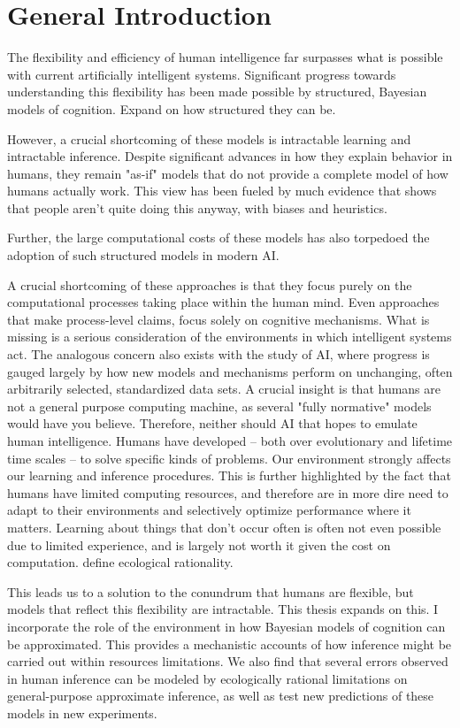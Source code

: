 \chapter{General Introduction}
\label{chap:intro}

The flexibility and efficiency of human intelligence far surpasses what is possible with current artificially intelligent systems. Significant progress towards understanding this flexibility has been made possible by structured, Bayesian models of cognition. Expand on how structured they can be.

However, a crucial shortcoming of these models is intractable learning and intractable inference. Despite significant advances in how they explain behavior in humans, they remain "as-if" models that do not provide a complete model of how humans actually work. This view has been fueled by much evidence that shows that people aren't quite doing this anyway, with biases and heuristics. 

Further, the large computational costs of these models has also torpedoed the adoption of such structured models in modern AI.

A crucial shortcoming of these approaches is that they focus purely on the computational processes taking place within the human mind. Even approaches that make process-level claims, focus solely on cognitive mechanisms. What is missing is a serious consideration of the environments in which intelligent systems act. The analogous concern also exists with the study of AI, where progress is gauged largely by how new models and mechanisms perform on unchanging, often arbitrarily selected, standardized data sets. A crucial insight is that humans are not a general purpose computing machine, as several "fully normative" models would have you believe. Therefore, neither should AI that hopes to emulate human intelligence. Humans have developed -- both over evolutionary and lifetime time scales -- to solve specific kinds of problems. Our environment strongly affects our learning and inference procedures. This is further highlighted by the fact that humans have limited computing resources, and therefore are in more dire need to adapt to their environments and selectively optimize performance where it matters. Learning about things that don't occur often is often not even possible due to limited experience, and is largely not worth it given the cost on computation.  define ecological rationality.

This leads us to a solution to the conundrum that humans are flexible, but models that reflect this flexibility are intractable. This thesis expands on this. I incorporate the role of the environment in how Bayesian models of cognition can be approximated. This provides a mechanistic accounts of how inference might be carried out within resources limitations. We also find that several errors observed in human inference can be modeled by ecologically rational limitations on general-purpose approximate inference, as well as test new predictions of these models in new experiments.

